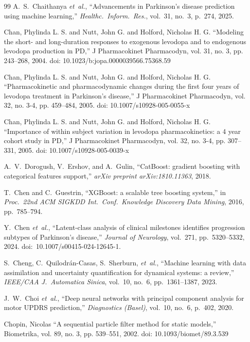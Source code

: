 \begin{thebibliography}{99}
A.~S.~Chaithanya \textit{et~al.}, ``Advancements in Parkinson's disease prediction using machine learning,'' \textit{Healthc.\ Inform.\ Res.}, vol.~31, no.~3, p.~274, 2025.

 Chan, Phylinda L. S. and Nutt, John G. and Holford, Nicholas H. G. ``Modeling the short- and long-duration responses to exogenous levodopa and to endogenous levodopa production in PD,'' J Pharmacokinet Pharmacodyn, vol. 31, no. 3, pp. 243--268, 2004. doi: 10.1023/b:jopa.0000039566.75368.59

 Chan, Phylinda L. S. and Nutt, John G. and Holford, Nicholas H. G. ``Pharmacokinetic and pharmacodynamic changes during the first four years of levodopa treatment in Parkinson's disease,'' J Pharmacokinet Pharmacodyn, vol. 32, no. 3-4, pp. 459--484, 2005. doi: 10.1007/s10928-005-0055-x

 Chan, Phylinda L. S. and Nutt, John G. and Holford, Nicholas H. G. ``Importance of within subject variation in levodopa pharmacokinetics: a 4 year cohort study in PD,'' J Pharmacokinet Pharmacodyn, vol. 32, no. 3-4, pp. 307--331, 2005. doi: 10.1007/s10928-005-0039-x

A.~V.~Dorogush, V.~Ershov, and A.~Gulin, ``CatBoost: gradient boosting with categorical features support,'' \textit{arXiv preprint arXiv:1810.11363}, 2018.

T.~Chen and C.~Guestrin, ``XGBoost: a scalable tree boosting system,'' in \textit{Proc.\ 22nd ACM SIGKDD Int.\ Conf.\ Knowledge Discovery Data Mining}, 2016, pp.~785--794.

Y.~Chen \textit{et~al.}, ``Latent-class analysis of clinical milestones identifies progression subtypes of Parkinson's disease,'' \textit{Journal of Neurology}, vol.~271, pp.~5320--5332, 2024. doi:~10.1007/s00415-024-12645-1.

S.~Cheng, C.~Quilodr{\'a}n-Casas, S.~Sherburn, \textit{et~al.}, ``Machine learning with data assimilation and uncertainty quantification for dynamical systems: a review,'' \textit{IEEE/CAA J.\ Automatica Sinica}, vol.~10, no.~6, pp.~1361--1387, 2023.

J.~W.~Choi \textit{et~al.}, ``Deep neural networks with principal component analysis for motor UPDRS prediction,'' \textit{Diagnostics (Basel)}, vol.~10, no.~6, p.~402, 2020.

 Chopin, Nicolas ``A sequential particle filter method for static models,'' Biometrika, vol. 89, no. 3, pp. 539--551, 2002. doi: 10.1093/biomet/89.3.539


\end{thebibliography}
